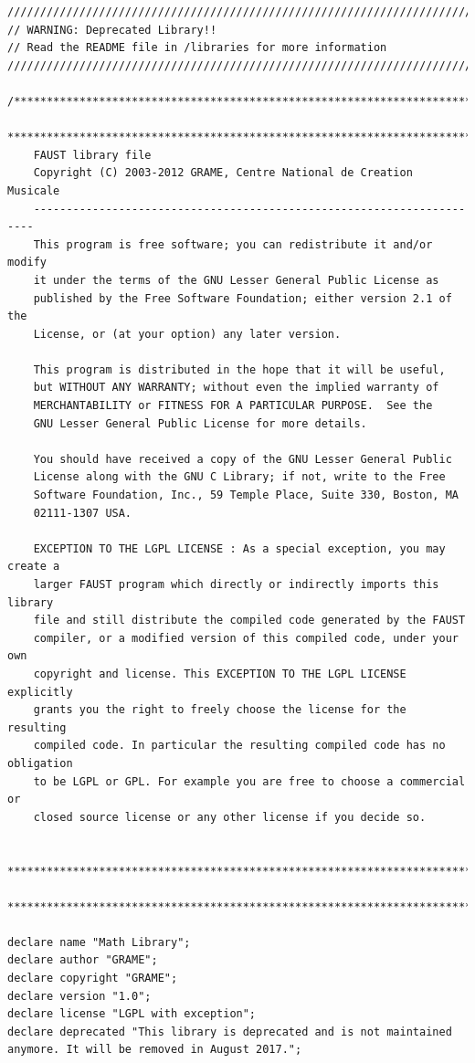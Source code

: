 \documentclass{article}
\begin{document}
\bigskip\bigskip
\begin{lstlisting}[caption=\texttt{math.lib}]
//////////////////////////////////////////////////////////////////////////////////////////
// WARNING: Deprecated Library!!
// Read the README file in /libraries for more information
//////////////////////////////////////////////////////////////////////////////////////////

/************************************************************************
 ************************************************************************
  	FAUST library file
	Copyright (C) 2003-2012 GRAME, Centre National de Creation Musicale
    ----------------------------------------------------------------------
    This program is free software; you can redistribute it and/or modify
    it under the terms of the GNU Lesser General Public License as
	published by the Free Software Foundation; either version 2.1 of the
	License, or (at your option) any later version.

    This program is distributed in the hope that it will be useful,
    but WITHOUT ANY WARRANTY; without even the implied warranty of
    MERCHANTABILITY or FITNESS FOR A PARTICULAR PURPOSE.  See the
    GNU Lesser General Public License for more details.

    You should have received a copy of the GNU Lesser General Public
 	License along with the GNU C Library; if not, write to the Free
  	Software Foundation, Inc., 59 Temple Place, Suite 330, Boston, MA
  	02111-1307 USA.

  	EXCEPTION TO THE LGPL LICENSE : As a special exception, you may create a
  	larger FAUST program which directly or indirectly imports this library
  	file and still distribute the compiled code generated by the FAUST
  	compiler, or a modified version of this compiled code, under your own
  	copyright and license. This EXCEPTION TO THE LGPL LICENSE explicitly
  	grants you the right to freely choose the license for the resulting
  	compiled code. In particular the resulting compiled code has no obligation
  	to be LGPL or GPL. For example you are free to choose a commercial or
  	closed source license or any other license if you decide so.

 ************************************************************************
 ************************************************************************/

declare name "Math Library";
declare author "GRAME";
declare copyright "GRAME";
declare version "1.0";
declare license "LGPL with exception";
declare deprecated "This library is deprecated and is not maintained anymore. It will be removed in August 2017."; 


\end{lstlisting}
\end{document}
